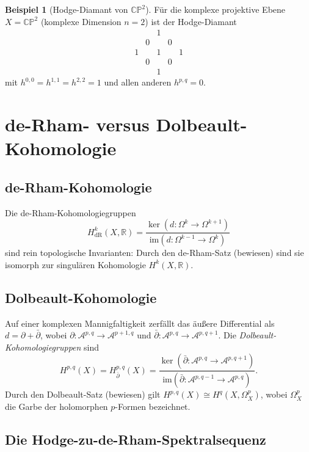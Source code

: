\documentclass[12pt,a4paper]{amsart}
\theoremstyle{definition}
\newtheorem{beispiel}[theorem]{Beispiel}
\theoremstyle{remark}
\begin{document}
\begin{beispiel}[Hodge-Diamant von $\mathbb{CP}^2$]
Für die komplexe projektive Ebene $X = \mathbb{CP}^2$ (komplexe Dimension $n=2$)
ist der Hodge-Diamant
\[
\begin{array}{ccccc}
 & & 1 & & \\
 & 0 & & 0 & \\
 1 & & 1 & & 1 \\
 & 0 & & 0 & \\
 & & 1 & &
\end{array}
\]
mit $h^{0,0}=h^{1,1}=h^{2,2}=1$ und allen anderen $h^{p,q}=0$.
\end{beispiel}

\section{de-Rham- versus Dolbeault-Kohomologie}
\label{sec:kohomologie}

\subsection{de-Rham-Kohomologie}

Die de-Rham-Kohomologiegruppen
\[
  H^k_{\mathrm{dR}}(X, \mathbb{R}) = \frac{\ker(d: \Omega^k \to \Omega^{k+1})}{\mathrm{im}(d: \Omega^{k-1} \to \Omega^k)}
\]
sind rein topologische Invarianten: Durch den de-Rham-Satz (bewiesen) sind sie
isomorph zur singulären Kohomologie $H^k(X, \mathbb{R})$.

\subsection{Dolbeault-Kohomologie}

Auf einer komplexen Mannigfaltigkeit zerfällt das äußere Differential als $d = \partial + \bar\partial$,
wobei $\partial: \mathcal{A}^{p,q} \to \mathcal{A}^{p+1,q}$ und
$\bar\partial: \mathcal{A}^{p,q} \to \mathcal{A}^{p,q+1}$. Die \emph{Dolbeault-Kohomologiegruppen}
sind
\[
  H^{p,q}(X) = H^{p,q}_{\bar\partial}(X) = \frac{\ker(\bar\partial: \mathcal{A}^{p,q} \to \mathcal{A}^{p,q+1})}{\mathrm{im}(\bar\partial: \mathcal{A}^{p,q-1} \to \mathcal{A}^{p,q})}.
\]
Durch den Dolbeault-Satz (bewiesen) gilt $H^{p,q}(X) \cong H^q(X, \Omega^p_X)$,
wobei $\Omega^p_X$ die Garbe der holomorphen $p$-Formen bezeichnet.

\subsection{Die Hodge-zu-de-Rham-Spektralsequenz}
\end{document}
